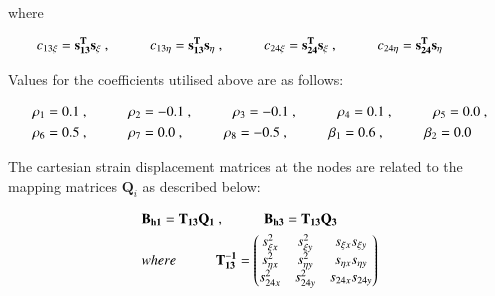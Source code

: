where

\begin{align*} 
	c_{13 \xi} = \mathbf{s_{13}^T} \mathbf{s_\xi}\ ,
	\hspace{10mm}
	c_{13 \eta} = \mathbf{s_{13}^T} \mathbf{s_\eta}\ ,
	\hspace{10mm}
	c_{24 \xi} = \mathbf{s_{24}^T} \mathbf{s_\xi}\ ,
	\hspace{10mm}
	c_{24 \eta} = \mathbf{s_{24}^T} \mathbf{s_\eta}
	\hspace{10mm}
\end{align*}

Values for the coefficients utilised above are as follows:

\begin{gather} 
	\begin{aligned}
		&\rho_1 = 0.1\ ,
		\hspace{10mm}
		\rho_2 = -0.1\ ,
		\hspace{10mm}
		\rho_3 = -0.1\ ,
		\hspace{10mm}
		\rho_4 = 0.1\ ,
		\hspace{10mm}
		\rho_5 = 0.0\ , \\
		&\rho_6 = 0.5\ ,
		\hspace{10mm}
		\rho_7 = 0.0\ ,
		\hspace{10mm}
		\rho_8 = -0.5\ ,
		\hspace{10mm}
		\beta_1 = 0.6\ ,
		\hspace{10mm}
		\beta_2 = 0.0
		\label{equation16}
	\end{aligned}
\end{gather}


The cartesian strain displacement matrices at the nodes are related to the mapping matrices $\mathbf{Q}_i$ as described below:


\begin{gather} 
	\begin{aligned}
		&\mathbf{B_{h1}} = \mathbf{T_{13}}  \mathbf{Q_{1}}\ ,
		\hspace{10mm}
		\mathbf{B_{h3}} = \mathbf{T_{13}}  \mathbf{Q_{3}}\\
		&where 
		\hspace{10mm} 
		\mathbf{T_{13}^{-1}} =
		\begin{pmatrix}
			s_{\xi x}^2 & s_{\xi y}^2 & s_{\xi x} s_{\xi y} \\
			s_{\eta x}^2 & s_{\eta y}^2 & s_{\eta x} s_{\eta y} \\
			s_{24 x}^2 & s_{24 y}^2 & s_{24 x} s_{24 y}
		\end{pmatrix}
		\label{equation17}
	\end{aligned}
\end{gather}


